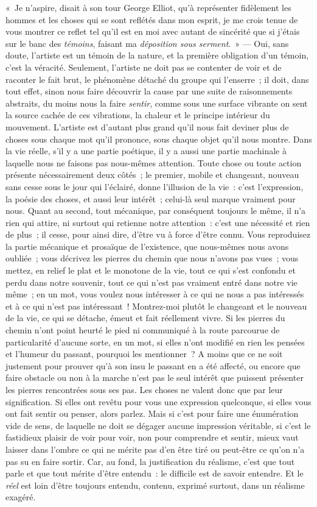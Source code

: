 \documentclass[french,twoside]{book} %
\begin{document}
« Je n’aspire, disait à son tour George Elliot, qu’à représenter fidèlement les hommes et les choses qui se sont reflétés dans mon esprit, je me crois tenue de vous montrer ce reflet tel qu’il est en moi avec autant de sincérité que si j’étais sur le banc des \emph{témoins}, faisant ma \emph{déposition sous serment}. » — Oui, sans doute, l’artiste est un témoin de la nature, et la première obligation d’un témoin, c’est la véracité. Seulement, l’artiste ne doit pas se contenter de voir et de raconter le fait brut, le phénomène détaché du groupe qui l’enserre ; il doit, dans tout effet, sinon nous faire découvrir la cause par une suite de raisonnements abstraits, du moins nous la faire \emph{sentir}, comme sous une surface vibrante on sent la source cachée de ces vibrations, la chaleur et le principe intérieur du mouvement. L’artiste est d’autant plus grand qu’il nous fait deviner plus de choses sous chaque mot qu’il prononce, sous chaque objet qu’il nous montre. Dans la vie réelle, s’il y a une partie poétique, il y a aussi une partie machinale à laquelle nous ne faisons pas nous-mêmes attention. Toute chose ou toute action présente nécessairement deux côtés ; le premier, mobile et changeant, nouveau sans cesse sous le jour qui l’éclairé, donne l’illusion de la vie : c’est l’expression, la poésie des choses, et aussi leur intérêt ; celui-là seul marque vraiment pour nous. Quant au second, tout mécanique, par conséquent toujours le même, il n’a rien qui attire, ni surtout qui retienne notre attention : c’est une nécessité et rien de plus ; il cesse, pour ainsi dire, d’être vu à force d’être connu. Vous reproduisez la partie mécanique et prosaïque de l’existence, que nous-mêmes nous avons oubliée ; vous décrivez les pierres du chemin que nous n’avons pas vues ; vous mettez, en relief le plat et le monotone de la vie, tout ce qui s’est confondu et perdu dans notre souvenir, tout ce qui n’est pas vraiment entré dans notre vie même ; en un mot, vous voulez nous intéresser à ce qui ne nous a pas intéressés et à ce qui n’est pas intéressant ! Montrez-moi plutôt le changeant et le nouveau de la vie, ce qui se détache, émeut et fait réellement vivre. Si les pierres du chemin n’ont point heurté le pied ni communiqué à la route parcourue de particularité d’aucune sorte, en un mot, si elles n’ont modifié en rien les pensées et l’humeur du passant, pourquoi les mentionner ? A moins que ce ne soit justement pour prouver qu’à son insu le passant en a été affecté, ou encore que faire obstacle ou non à la marche n’est pas le seul intérêt que puissent présenter les pierres rencontrées sous ses pas. Les choses ne valent donc que par leur signification. Si elles ont revêtu pour vous une expression quelconque, si elles vous ont fait sentir ou penser, alors parlez. Mais si c’est pour faire une énumération vide de sens, de laquelle ne doit se dégager aucune impression véritable, si c’est le fastidieux plaisir de voir pour voir, non pour comprendre et sentir, mieux vaut laisser dans l’ombre ce qui ne mérite pas d’en être tiré ou peut-être ce qu’on n’a pas su en faire sortir. Car, au fond, la justification du réalisme, c’est que tout parle et que tout mérite d’être entendu : le difficile est de savoir entendre. Et le \emph{réel} est loin d’être toujours entendu, contenu, exprimé surtout, dans un réalisme exagéré.\par
\end{document}
